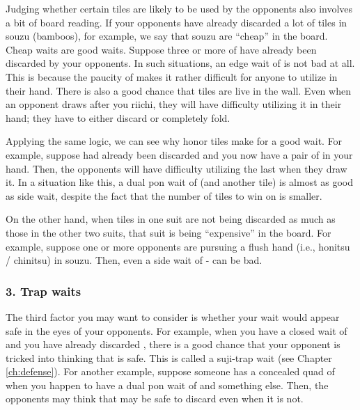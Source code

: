 \bigskip
Judging whether certain tiles are likely to be used by the opponents also involves a bit of board reading. If your opponents have already discarded a lot of tiles in {\jap souzu} (bamboos), for example, we say that {\jap souzu} are ``cheap'' in the board. Cheap waits are good waits. Suppose three or more of {\LARGE{}} have already been discarded by your opponents. In such situations, an edge wait of {\LARGE {}} is not bad at all. This is because the paucity of {\LARGE{}} makes it rather difficult for anyone to utilize {\LARGE{}} in their hand. There is also a good chance that {\LARGE{}} tiles are live in the wall. Even when an opponent draws {\LARGE{}} after you riichi, they will have difficulty utilizing it in their hand; they have to either discard {\LARGE{}} or completely fold. 

\bigskip
Applying the same logic, we can see why honor tiles make for a good wait. 
For example, suppose {\LARGE\zhong} had already been discarded and you now have a pair of {\LARGE\zhong} in your hand. Then, the opponents will have difficulty utilizing the last {\LARGE\zhong} when they draw it. In a situation like this, a dual {\jap pon} wait of {\LARGE\zhong} (and another tile) is almost as good as side wait, despite the fact that the number of tiles to win on is smaller. 

\bigskip
On the other hand, when tiles in one suit are not being discarded as much as those in the other two suits, that suit is being ``expensive'' in the board. For example, suppose one or more opponents are pursuing a flush hand (i.e., {\jap honitsu} / {\jap chinitsu}) in {\jap souzu}. Then, even a side wait of {\LARGE {}-} can be bad. 

\subsubsection{3. Trap waits}

The third factor you may want to consider is whether your wait would appear safe in the eyes of your opponents. For example, when you have a closed wait of {\LARGE{}} and you have already discarded {\LARGE{}}, there is a good chance that your opponent is tricked into thinking that {\LARGE{}} is safe. This is called a {\jap suji}-trap wait (see Chapter \ref{ch:defense}). 
For another example, suppose someone has a concealed quad of {\LARGE{}} when you happen to have a dual {\jap pon} wait of {\LARGE{}} and something else. Then, the opponents may think that {\LARGE{}} may be safe to discard even when it is not. 

